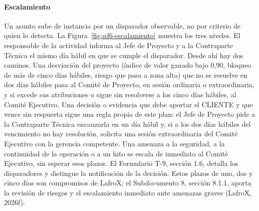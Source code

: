 \paragraph{Escalamiento} Un asunto sube de instancia por un disparador observable, no por criterio de quien lo detecta. La Figura~\ref{fig:sd6-escalamiento} muestra los tres niveles. El responsable de la actividad informa al Jefe de Proyecto y a la Contraparte Técnica el mismo día hábil en que se cumple el disparador. Desde ahí hay dos caminos. Una desviación del proyecto (índice de valor ganado bajo 0,90, bloqueo de más de cinco días hábiles, riesgo que pasa a zona alta) que no se resuelve en dos días hábiles pasa al Comité de Proyecto, en sesión ordinaria o extraordinaria, y si excede sus atribuciones o sigue sin resolverse a los cinco días hábiles, al Comité Ejecutivo. Una decisión o evidencia que debe aportar el CLIENTE y que vence sin respuesta sigue una regla propia de este plan: el Jefe de Proyecto pide a la Contraparte Técnica encauzarla en un día hábil y, si a los dos días hábiles del vencimiento no hay resolución, solicita una sesión extraordinaria del Comité Ejecutivo con la gerencia competente. Una amenaza a la seguridad, a la continuidad de la operación o a un hito se escala de inmediato al Comité Ejecutivo, sin esperar esos plazos. El Formulario T-9, sección 1.6, detalla los disparadores y distingue la notificación de la decisión. Estos plazos de uno, dos y cinco días son compromisos de LafroX; el Subdocumento 8, sección 8.1.1, aporta la revisión de riesgos y el escalamiento inmediato ante amenazas graves (LafroX, 2026f).

